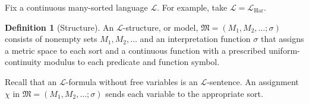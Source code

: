 \documentclass{amsart}
\theoremstyle{definition}
\newtheorem{definition}{Definition}[section]
\theoremstyle{remark}
\newtheorem{remark}[definition]{Remark}
\numberwithin{equation}{section}
\begin{document}
	
	
	
	Fix a continuous many-sorted language $\mathcal L$. For example, take $\mathcal L=\mathcal L_{\mathrm{Har}}$.
	\begin{definition}[Structure]
		An $\mathcal L$-structure, or model, $\mathfrak M=(M_1,M_2,\ldots;\sigma)$ consists of nonempty sets $M_1,M_2,\ldots$ and an interpretation function $\sigma$ that assigns a metric space to each sort and a continuous function with a prescribed uniform-continuity modulus to each predicate and function symbol.
	\end{definition}
	
	Recall that an $\mathcal L$-formula without free variables is an $\mathcal L$-sentence. An assignment $\chi$ in $\mathfrak M=(M_1,M_2,\dots;\sigma)$ sends each variable to the appropriate sort.
	
\end{document}
